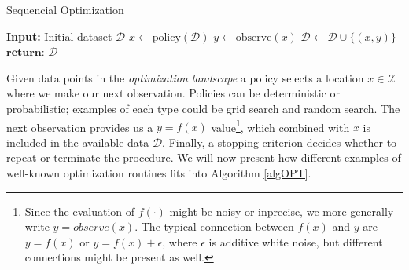 \begin{algorithm}[H]
\caption{Sequencial Optimization \cite{bayesoptbook} }\label{algOPT}
\begin{algorithmic}
\State \textbf{Input:} Initial dataset $\mathcal{D}$  
    \State $x \gets \text{policy}(\mathcal{D})$ 
    \State $y \gets \text{observe}(x)$ 
    \State $\mathcal{D} \gets \mathcal{D} \cup \{(x,y)\} $ 
\EndWhile
\State $\textbf{return: } \mathcal{D}$
\end{algorithmic}
\end{algorithm}

Given data points in the \textit{optimization landscape}
a policy selects a location $x \in \mathcal{X}$ where we make our next observation. Policies can be
deterministic or probabilistic; examples of each type could be grid search and random search. The
next observation provides us a $y = f(x)$ value\footnote{Since the evaluation of $f(\cdot)$ might be
noisy or inprecise, we more generally write $y = observe(x)$. The typical connection between $f(x)$
and $y$ are $y = f(x)$ or $y = f(x) + \epsilon$, where $\epsilon$ is additive white noise, but
different connections might be present as well.}, which combined with $x$ is included in the
available data $\mathcal{D}$. Finally, a stopping criterion decides whether to repeat or terminate
the procedure. We will now present how different examples of well-known optimization routines fits
into Algorithm \ref{algOPT}.


